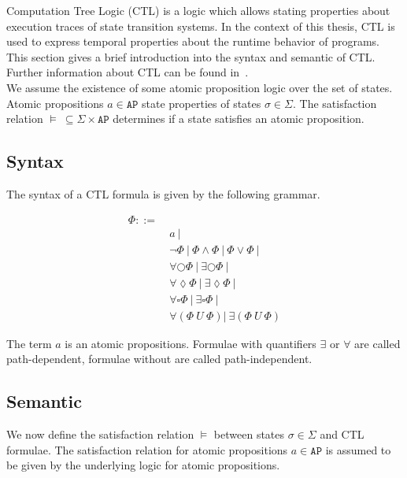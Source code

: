\documentclass[11pt,a4paper,titlepage]{article}
\theoremstyle{definition}
\begin{document}
Computation Tree Logic (CTL) is a logic which allows stating properties about execution traces of state transition systems. 
In the context of this thesis, CTL is used to express temporal properties about the runtime behavior of programs. 
This section gives a brief introduction into the syntax and semantic of CTL.  
Further information about CTL can be found in~\cite{baier2008principles}.\\

We assume the existence of some atomic proposition logic over the set of states. 
Atomic propositions $a \in \mathtt{AP}$ state properties of states $\sigma \in \Sigma$. 
The satisfaction relation $\models \ \subseteq \Sigma \times \mathtt{AP}$ determines 
if a state satisfies an atomic proposition.


\subsection{Syntax}
The syntax of a CTL formula is given by the following grammar.

\begin{align*}
    \Phi  ::= \ & \\ 
    & a \ | \\
    & \neg \Phi \ | \ \Phi \land \Phi \ | \ \Phi \lor \Phi \ | \\
    & \forall\bigcirc\Phi \ | \ \exists\bigcirc\Phi \ | \\
    & \forall\lozenge\Phi \ | \ \exists\lozenge\Phi \ | \\
    & \forall\square\Phi \ | \ \exists\square\Phi \ | \\
    & \forall(\Phi \ U \ \Phi) | \ \exists(\Phi \ U \ \Phi) 
\end{align*}

The term $a$ is an atomic propositions. Formulae with quantifiers $\exists$ or $\forall$ are called
path-dependent, formulae without are called path-independent.

\subsection{Semantic}

We now define the satisfaction relation $\models$ between states $\sigma \in \Sigma$ and CTL formulae.
The satisfaction relation for atomic propositions $a \in \mathtt{AP}$ is assumed to be given by the underlying 
logic for atomic propositions.
\end{document}
